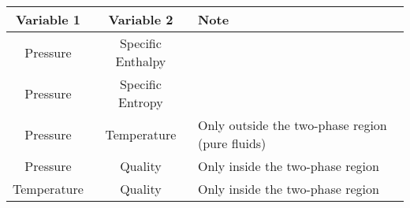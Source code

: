 \begin{tabular}{|c c l|}
    \hline
    \rowcolor{bluepoli!40} %
    \textbf{Variable 1} & \textbf{Variable 2} & \textbf{Note} \T\B \\
    \hline \hline
    Pressure & Specific Enthalpy &  \T\B\\
    Pressure & Specific Entropy &  \T\B\\
    Pressure & Temperature & Only outside the two-phase region (pure fluids) \T\B\\
    Pressure & Quality & Only inside the two-phase region \T\B\\
    Temperature & Quality & Only inside the two-phase region \T\B\\
    \hline
\end{tabular}